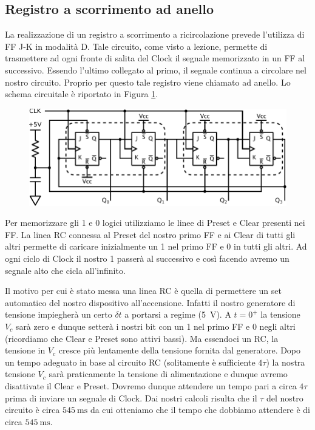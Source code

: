 \subsection{Registro a scorrimento ad anello}

La realizzazione di un registro a scorrimento a ricircolazione prevede l'utilizza di FF J-K in modalità D. Tale circuito, come visto a lezione, permette di trasmettere ad ogni fronte di salita del Clock il segnale memorizzato in un FF al successivo. Essendo l'ultimo collegato al primo, il segnale continua a circolare nel nostro circuito. Proprio per questo tale registro viene chiamato ad anello. Lo schema circuitale è riportato in Figura \ref{cir12:shift}.

\begin{figure}[htpc]
\centering
	\includegraphics[width=.85\textwidth]{../E12/latex/shift_register.pdf}
	\caption{}
	\label{cir12:shift}
\end{figure}

Per memorizzare gli 1 e 0 logici utilizziamo le linee di Preset e Clear presenti nei FF. La linea RC connessa al Preset del nostro primo FF e ai Clear di tutti gli altri permette di caricare inizialmente un 1 nel primo FF e 0 in tutti gli altri. Ad ogni ciclo di Clock il nostro 1 passerà al successivo e così facendo avremo un segnale alto che cicla all'infinito.

Il motivo per cui è stato messa una linea RC è quella di permettere un set automatico del nostro dispositivo all'accensione. Infatti il nostro generatore di tensione impiegherà un certo $\delta t$ a portarsi a regime (\SI{5}{\volt}). A $t=0^+$ la tensione $V_c$ sarà zero e dunque setterà i nostri bit con un 1 nel primo FF e 0 negli altri (ricordiamo che Clear e Preset sono attivi bassi). Ma essendoci un RC, la tensione in $V_c$ cresce più lentamente della tensione fornita dal generatore. Dopo un tempo adeguato in base al circuito RC (solitamente è sufficiente $4\tau$) la nostra tensione $V_c$ sarà praticamente la tensione di alimentazione e dunque avremo disattivate il Clear e Preset. Dovremo dunque attendere un tempo pari a circa $4\tau$ prima di inviare un segnale di Clock. Dai nostri calcoli risulta che il $\tau$ del nostro circuito è circa $\SI{545}{\milli\second}$ da cui otteniamo che il tempo che dobbiamo attendere è di circa $\SI{545}{\milli\second}$.

